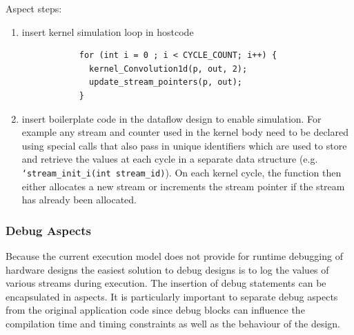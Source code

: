 Aspect steps:

\begin{enumerate}

\item insert kernel simulation loop in hostcode %
  \begin{figure}[!h]
    \begin{lstlisting}
      for (int i = 0 ; i < CYCLE_COUNT; i++) {
        kernel_Convolution1d(p, out, 2);
        update_stream_pointers(p, out);
      }
    \end{lstlisting}
  \end{figure}

\item insert boilerplate code in the dataflow design to enable simulation.
  For example any stream and counter used in the kernel body need to
  be declared using special calls that also pass in unique identifiers
  which are used to store and retrieve the values at each cycle in a
  separate data structure (e.g. \texttt{`stream\_init\_i(int
    stream\_id)}). On each kernel cycle, the function then either
  allocates a new stream or increments the stream pointer if the
  stream has already been allocated.

\end{enumerate}

\lstset{style=MaxC}


\subsubsection{Debug Aspects}

Because the current execution model does not provide for runtime
debugging of hardware designs the easiest solution to debug designs is
to log the values of various streams during execution. The insertion
of debug statements can be encapsulated in aspects. It is particularly
important to separate debug aspects from the original application code
since debug blocks can influence the compilation time and timing
constraints as well as the behaviour of the design.

